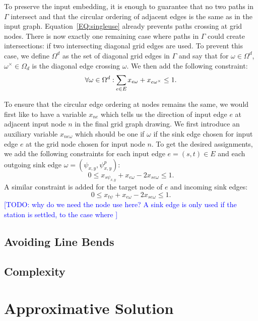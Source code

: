 \documentclass{sig-alternate-sigmod09}
\newcommand\TODO[1]{\textcolor{blue}{\small [TODO: #1]}}
\begin{document}
To preserve the input embedding, it is enough to guarantee that no two paths in $\Gamma$ intersect and that the circular ordering of adjacent edges is the same as in the input graph.
Equation~\ref{EQ:singleuse} already prevents paths crossing at grid nodes.
There is now exactly one remaining case where paths in $\Gamma$ could create intersections: if two intersecting diagonal grid edges are used.
To prevent this case, we define $\Omega^d$ as the set of diagonal grid edges in $\Gamma$ and say that for $\omega \in \Omega^d$, $\omega^{\times} \in \Omega_d$ is the diagonal edge crossing $\omega$. 
We then add the following constraint:
%
\begin{equation}
  \forall \omega \in \Omega^d: \Psum{e \in E} x_{e\omega} + x_{e\omega^{\times}} \leq 1. \label{EQ:crossing}
\end{equation}

To ensure that the circular edge ordering at nodes remains the same, we would first like to have a variable $x_{ne}$ which tells us the direction of input edge $e$ at adjacent input node $n$ in the final grid graph drawing.
We first introduce an auxiliary variable $x_{ne\omega}$ which should be one if $\omega$ if the sink edge chosen for input edge $e$ at the grid node chosen for input node $n$.
To get the desired assignments, we add the following constraints for each input edge $e = (s, t) \in E$ and each outgoing sink edge $\omega = (\psi_{x, y}, \psi_{x,y}^p)$:
%
\begin{equation}
  0 \leq x_{s\psi_{x, y}} + x_{e\omega} - 2x_{se\omega} \leq 1. \label{EQ:adjedgeout}
\end{equation}
%
A similar constraint is added for the target node of $e$ and incoming sink edges:
%
\begin{equation}
  0 \leq x_{t\psi} + x_{e\omega} - 2x_{se\omega} \leq 1. \label{EQ:adjin}
\end{equation}
%
\TODO{why do we need the node use here? A sink edge is only used if the station is settled, to the case where }

\subsection{Avoiding Line Bends}

\subsection{Complexity}

\section{Approximative Solution}
\end{document}
